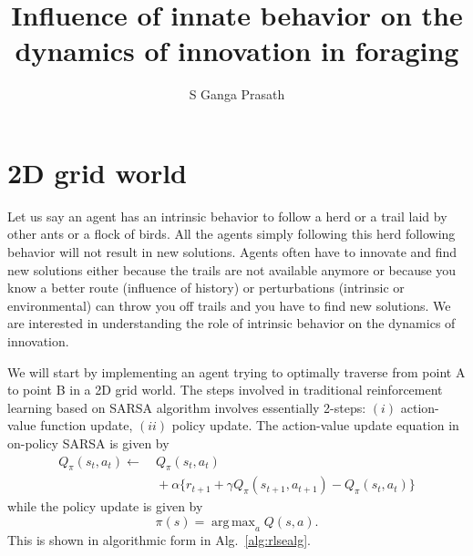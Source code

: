 \documentclass[12pt]{article}
\DeclareMathOperator*{\argmax}{arg\,max}
\begin{document}
\title{Influence of innate behavior on the dynamics of innovation in foraging}
\author{S Ganga Prasath}
\date{}


\maketitle
\section{2D grid world}
Let us say an agent has an intrinsic behavior to follow a herd or a trail
laid by other ants or a flock of birds. All the agents simply following this
herd following behavior will not result in new solutions. Agents often have
to innovate and find new solutions either because the trails are not available
anymore or because you know a better route (influence of history) or perturbations
(intrinsic or environmental) can throw you off trails and you have to find new solutions.
We are interested in understanding the role of intrinsic behavior on the dynamics of innovation.

We will start by implementing an agent trying to optimally traverse from point
A to point B in a 2D grid world. The steps involved in traditional reinforcement
learning based on SARSA algorithm involves essentially 2-steps: $(i)$ action-value
function update, $(ii)$ policy update. The action-value update equation in on-policy SARSA is given by
\begin{align}
Q_\pi(s_t, a_t) \leftarrow & \ Q_\pi(s_t, a_t) \nonumber \\
& \ + \alpha \{ r_{t+1} + \gamma Q_\pi(s_{t+1}, a_{t+1}) - Q_\pi(s_t, a_t) \}
\end{align}
while the policy update is given by
\[
\pi(s) = \argmax_a Q(s, a).
\]
This is shown in algorithmic form in Alg.~\ref{alg:rlsealg}. \\[5pt]
\end{document}
